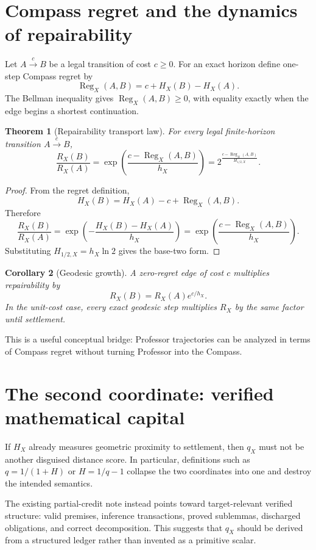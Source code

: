 \documentclass[11pt]{article}
\newtheorem{theorem}{Theorem}[section]
\newtheorem{corollary}[theorem]{Corollary}
\theoremstyle{definition}
\theoremstyle{remark}
\newcommand{\Reg}{\operatorname{Reg}}
\begin{document}
\section{Compass regret and the dynamics of repairability}

Let $A\xrightarrow{c}B$ be a legal transition of cost $c\ge0$. For an exact horizon define one-step Compass regret by
\[
\boxed{\Reg_X(A,B)=c+H_X(B)-H_X(A).}
\]
The Bellman inequality gives $\Reg_X(A,B)\ge0$, with equality exactly when the edge begins a shortest continuation.

\begin{theorem}[Repairability transport law]
For every legal finite-horizon transition $A\xrightarrow{c}B$,
\[
\boxed{
\frac{R_X(B)}{R_X(A)}
=
\exp\!\left(\frac{c-\Reg_X(A,B)}{h_X}\right)
=
2^{\frac{c-\Reg_X(A,B)}{H_{1/2,X}}}.
}
\]
\end{theorem}

\begin{proof}
From the regret definition,
\[
H_X(B)=H_X(A)-c+\Reg_X(A,B).
\]
Therefore
\[
\frac{R_X(B)}{R_X(A)}
=
\exp\!\left(-\frac{H_X(B)-H_X(A)}{h_X}\right)
=
\exp\!\left(\frac{c-\Reg_X(A,B)}{h_X}\right).
\]
Substituting $H_{1/2,X}=h_X\ln2$ gives the base-two form.
\end{proof}

\begin{corollary}[Geodesic growth]
A zero-regret edge of cost $c$ multiplies repairability by
\[
R_X(B)=R_X(A)e^{c/h_X}.
\]
In the unit-cost case, every exact geodesic step multiplies $R_X$ by the same factor until settlement.
\end{corollary}

This is a useful conceptual bridge: Professor trajectories can be analyzed in terms of Compass regret without turning Professor into the Compass.

\section{The second coordinate: verified mathematical capital}

If $H_X$ already measures geometric proximity to settlement, then $q_X$ must not be another disguised distance score. In particular, definitions such as $q=1/(1+H)$ or $H=1/q-1$ collapse the two coordinates into one and destroy the intended semantics.

The existing partial-credit note instead points toward target-relevant verified structure: valid premises, inference transactions, proved sublemmas, discharged obligations, and correct decomposition. This suggests that $q_X$ should be derived from a structured ledger rather than invented as a primitive scalar.
\end{document}
